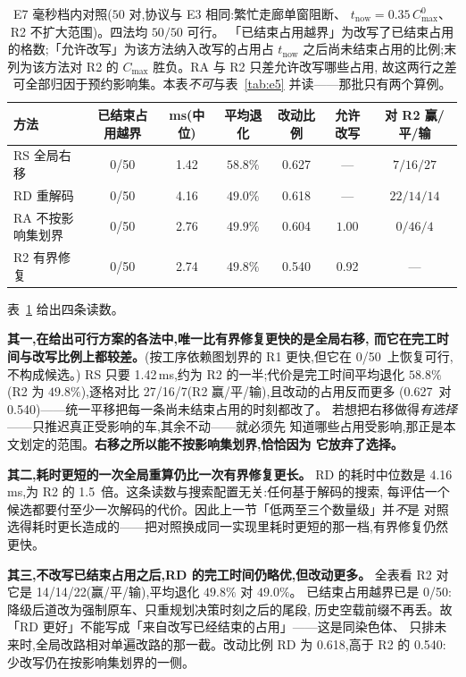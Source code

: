 \documentclass[manuscript,screen,review]{acmart}
\newcommand{\NPairs}{50}
\newcommand{\FeasRone}{0/\NPairs}            %
\newcommand{\ClosureAliveFrac}{92\%}
\newcommand{\MsShift}{1.42}          %
\newcommand{\MsRedecode}{4.16}       %
\newcommand{\MsAllFuture}{2.76}      %
\newcommand{\MsCheapRtwo}{2.74}      %
\newcommand{\RedecodeRatio}{1.5}     %
\newcommand{\ShiftBad}{0/\NPairs}    %
\newcommand{\RedecodeBad}{0/\NPairs}
\newcommand{\WinVsShift}{27/16/7}    %
\newcommand{\WinVsRedecode}{14/14/22}
\newcommand{\ResFracCheapRtwo}{0.540}
\newcommand{\ResFracShift}{0.627}
\newcommand{\ResFracRedecode}{0.618}
\newcommand{\ResFracAllFuture}{0.604}
\newcommand{\ClosureShareMean}{0.92} %
\begin{document}
\begin{table}[t]
\centering
\caption{E7 毫秒档内对照(\(\NPairs\) 对,协议与 E3 相同:繁忙走廊单窗阻断、
\(t_{\mathrm{now}}=0.35\,C_{\max}^{0}\)、R2 不扩大范围)。四法均 \(\NPairs/\NPairs\) 可行。
「已结束占用越界」为改写了已结束占用的格数;「允许改写」为该方法纳入改写的占用占 \(t_{\mathrm{now}}\)
之后尚未结束占用的比例;末列为该方法对 R2 的 \(C_{\max}\) 胜负。RA 与 R2 只差允许改写哪些占用,
故这两行之差可全部归因于预约影响集。本表\emph{不可}与表~\ref{tab:e5} 并读——那批只有两个算例。}
\label{tab:cheap}
\small
\begin{tabular}{@{}lcccccc@{}}
\toprule
方法 & 已结束占用越界 & ms(中位) & 平均退化 & 改动比例 & 允许改写 & 对 R2 赢/平/输 \\
\midrule
RS 全局右移      & \ShiftBad     & \MsShift    & \(58.8\%\) & \ResFracShift    & ---   & \(7/16/27\) \\
RD 重解码        & \RedecodeBad  & \MsRedecode & \(49.0\%\) & \ResFracRedecode & ---   & \(22/14/14\) \\
RA 不按影响集划界 & \ShiftBad     & \MsAllFuture & \(49.9\%\) & \ResFracAllFuture & \(1.00\) & \(0/46/4\) \\
R2 有界修复      & \ShiftBad     & \MsCheapRtwo & \(49.8\%\) & \ResFracCheapRtwo & \ClosureShareMean & --- \\
\bottomrule
\end{tabular}
\end{table}

表~\ref{tab:cheap} 给出四条读数。

\textbf{其一,在给出可行方案的各法中,唯一比有界修复更快的是全局右移,
而它在完工时间与改写比例上都较差。}(按工序依赖图划界的 R1 更快,但它在 \FeasRone\ 上恢复可行,
不构成候选。)
RS 只要 \MsShift\,ms,约为 R2 的一半;代价是完工时间平均退化 \(58.8\%\)(R2 为
\(49.8\%\)),逐格对比 \WinVsShift(R2 赢/平/输),且改动的占用反而更多
(\ResFracShift\ 对 \ResFracCheapRtwo)——统一平移把每一条尚未结束占用的时刻都改了。
若想把右移做得\emph{有选择}——只推迟真正受影响的车,其余不动——就必须先
知道哪些占用受影响,那正是本文划定的范围。\textbf{右移之所以能不按影响集划界,恰恰因为
它放弃了选择。}

\textbf{其二,耗时更短的一次全局重算仍比一次有界修复更长。} RD 的耗时中位数是
\MsRedecode\,ms,为 R2 的 \RedecodeRatio\ 倍。这条读数与搜索配置无关:任何基于解码的搜索,
每评估一个候选都要付至少一次解码的代价。因此上一节「低两至三个数量级」并\emph{不}是
对照选得耗时更长造成的——把对照换成同一实现里耗时更短的那一档,有界修复仍然更快。

\textbf{其三,不改写已结束占用之后,RD 的完工时间仍略优,但改动更多。}
全表看 R2 对它是 \WinVsRedecode(赢/平/输),平均退化 \(49.8\%\) 对 \(49.0\%\)。
已结束占用越界已是 \RedecodeBad:降级后道改为强制原车、只重规划决策时刻之后的尾段,
历史空载前缀不再丢。故「RD 更好」不能写成「来自改写已经结束的占用」——这是同染色体、
只排未来时,全局改路相对单遍改路的那一截。改动比例 RD 为 \ResFracRedecode,高于 R2 的
\ResFracCheapRtwo:少改写仍在按影响集划界的一侧。
\end{document}
